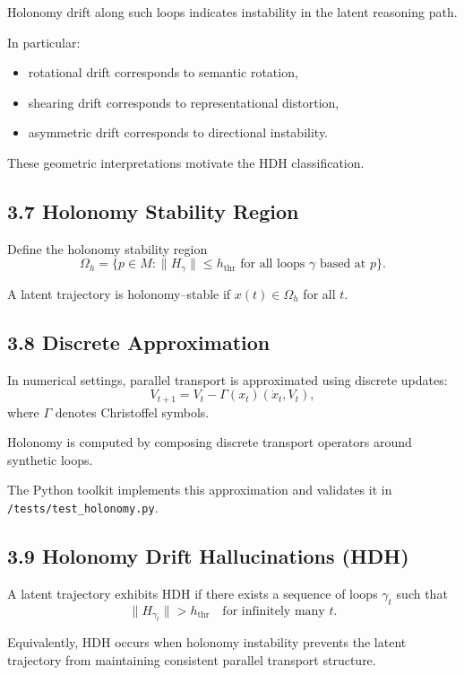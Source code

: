 Holonomy drift along such loops indicates instability in the latent
reasoning path.

In particular:
\begin{itemize}
\item rotational drift corresponds to semantic rotation,
\item shearing drift corresponds to representational distortion,
\item asymmetric drift corresponds to directional instability.
\end{itemize}

These geometric interpretations motivate the HDH classification.

\subsection*{3.7 Holonomy Stability Region}

Define the holonomy stability region
\[
\Omega_h
= \{ p \in M : \|H_\gamma\| \le h_{\mathrm{thr}}
   \text{ for all loops } \gamma \text{ based at } p \}.
\]

A latent trajectory is holonomy–stable if $x(t) \in \Omega_h$ for all $t$.

\subsection*{3.8 Discrete Approximation}

In numerical settings, parallel transport is approximated using discrete
updates:
\[
V_{t+1}
= V_t - \Gamma(x_t)(\dot{x}_t, V_t),
\]
where $\Gamma$ denotes Christoffel symbols.

Holonomy is computed by composing discrete transport operators around
synthetic loops.

The Python toolkit implements this approximation and validates it in
\texttt{/tests/test\_holonomy.py}.

\subsection*{3.9 Holonomy Drift Hallucinations (HDH)}

A latent trajectory exhibits HDH if there exists a sequence of loops
$\gamma_t$ such that
\[
\|H_{\gamma_t}\| > h_{\mathrm{thr}}
\quad \text{for infinitely many } t.
\]

Equivalently, HDH occurs when holonomy instability prevents the latent
trajectory from maintaining consistent parallel transport structure.

